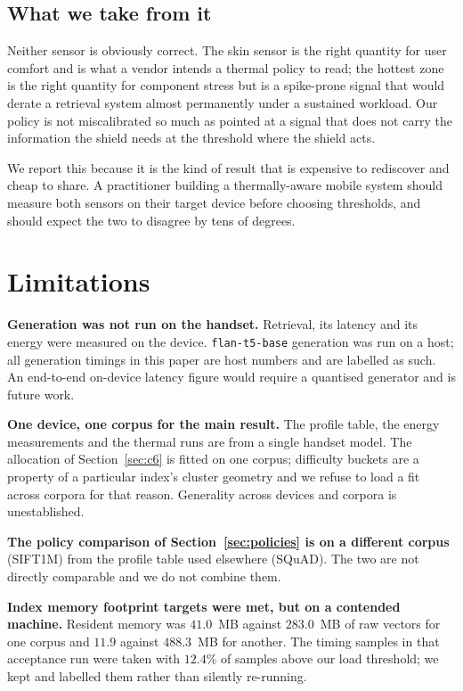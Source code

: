 \documentclass[conference]{IEEEtran}
\begin{document}
\subsection{What we take from it}

Neither sensor is obviously correct. The skin sensor is the right quantity for
user comfort and is what a vendor intends a thermal policy to read; the hottest
zone is the right quantity for component stress but is a spike-prone signal
that would derate a retrieval system almost permanently under a sustained
workload. Our policy is not miscalibrated so much as pointed at a signal that
does not carry the information the shield needs at the threshold where the
shield acts.

We report this because it is the kind of result that is expensive to rediscover
and cheap to share. A practitioner building a thermally-aware mobile system
should measure both sensors on their target device before choosing thresholds,
and should expect the two to disagree by tens of degrees.

\section{Limitations}

\textbf{Generation was not run on the handset.} Retrieval, its latency and its
energy were measured on the device. \texttt{flan-t5-base} generation was run on
a host; all generation timings in this paper are host numbers and are labelled
as such. An end-to-end on-device latency figure would require a quantised
generator and is future work.

\textbf{One device, one corpus for the main result.} The profile table, the
energy measurements and the thermal runs are from a single handset model. The
allocation of Section~\ref{sec:c6} is fitted on one corpus; difficulty buckets
are a property of a particular index's cluster geometry and we refuse to load a
fit across corpora for that reason. Generality across devices and corpora is
unestablished.

\textbf{The policy comparison of Section~\ref{sec:policies} is on a different
corpus} (SIFT1M) from the profile table used elsewhere (SQuAD). The two are not
directly comparable and we do not combine them.

\textbf{Index memory footprint targets were met, but on a contended machine.}
Resident memory was $41.0$~MB against $283.0$~MB of raw vectors for one corpus
and $11.9$ against $488.3$~MB for another. The timing samples in that
acceptance run were taken with $12.4\%$ of samples above our load threshold; we
kept and labelled them rather than silently re-running.
\end{document}
